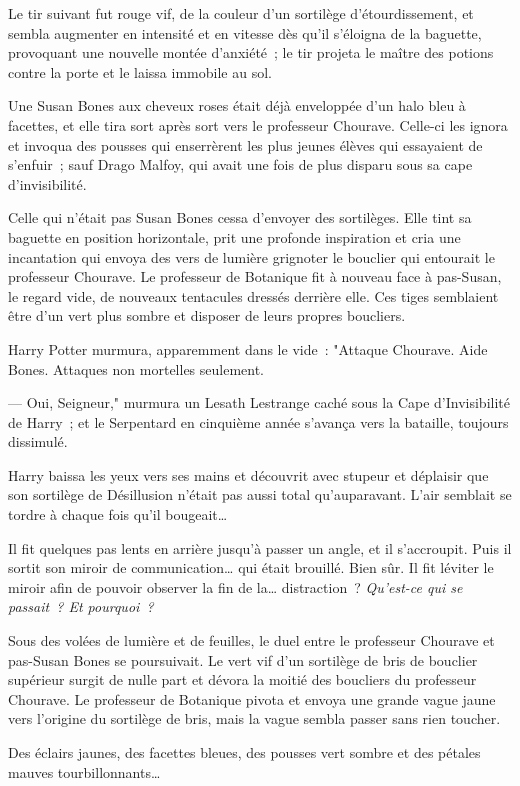 Le tir suivant fut rouge vif, de la couleur d'un sortilège d'étourdissement, et sembla augmenter en intensité et en vitesse dès qu'il s'éloigna de la baguette, provoquant une nouvelle montée d'anxiété~; le tir projeta le maître des potions contre la porte et le laissa immobile au sol.

Une Susan Bones aux cheveux roses était déjà enveloppée d'un halo bleu à facettes, et elle tira sort après sort vers le professeur Chourave. Celle-ci les ignora et invoqua des pousses qui enserrèrent les plus jeunes élèves qui essayaient de s'enfuir~; sauf Drago Malfoy, qui avait une fois de plus disparu sous sa cape d'invisibilité.

Celle qui n'était pas Susan Bones cessa d'envoyer des sortilèges. Elle tint sa baguette en position horizontale, prit une profonde inspiration et cria une incantation qui envoya des vers de lumière grignoter le bouclier qui entourait le professeur Chourave. Le professeur de Botanique fit à nouveau face à pas-Susan, le regard vide, de nouveaux tentacules dressés derrière elle. Ces tiges semblaient être d'un vert plus sombre et disposer de leurs propres boucliers.

Harry Potter murmura, apparemment dans le vide~: "Attaque Chourave. Aide Bones. Attaques non mortelles seulement.

--- Oui, Seigneur," murmura un Lesath Lestrange caché sous la Cape d'Invisibilité de Harry~; et le Serpentard en cinquième année s'avança vers la bataille, toujours dissimulé.

Harry baissa les yeux vers ses mains et découvrit avec stupeur et déplaisir que son sortilège de Désillusion n'était pas aussi total qu'auparavant. L'air semblait se tordre à chaque fois qu'il bougeait…

Il fit quelques pas lents en arrière jusqu'à passer un angle, et il s'accroupit. Puis il sortit son miroir de communication… qui était brouillé. Bien sûr. Il fit léviter le miroir afin de pouvoir observer la fin de la… distraction~? \emph{Qu'est-ce qui se passait~? Et pourquoi~?}

Sous des volées de lumière et de feuilles, le duel entre le professeur Chourave et pas-Susan Bones se poursuivait. Le vert vif d'un sortilège de bris de bouclier supérieur surgit de nulle part et dévora la moitié des boucliers du professeur Chourave. Le professeur de Botanique pivota et envoya une grande vague jaune vers l'origine du sortilège de bris, mais la vague sembla passer sans rien toucher.

Des éclairs jaunes, des facettes bleues, des pousses vert sombre et des pétales mauves tourbillonnants…

